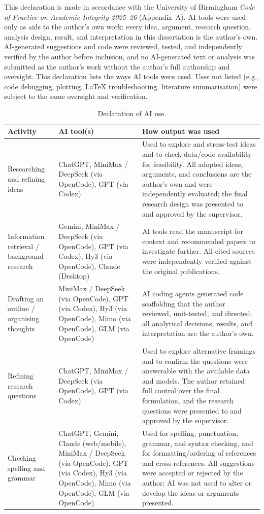 \documentclass[12pt,a4paper]{article}
\begin{document}
This declaration is made in accordance with the University of Birmingham \emph{Code of Practice on Academic Integrity 2025--26} (Appendix~A). AI tools were used only as aids to the author's own work: every idea, argument, research question, analysis design, result, and interpretation in this dissertation is the author's own. AI-generated suggestions and code were reviewed, tested, and independently verified by the author before inclusion, and no AI-generated text or analysis was submitted as the author's work without the author's full authorship and oversight. This declaration lists the ways AI tools were used. Uses not listed (e.g., code debugging, plotting, LaTeX troubleshooting, literature summarisation) were subject to the same oversight and verification.

\begin{table}[ht]
\centering
\small
\caption{Declaration of AI use.}
\label{tab:ai-declaration}
\begin{tabular}{p{}p{}p{}}
\toprule
\textbf{Activity} & \textbf{AI tool(s)} & \textbf{How output was used} \\
\midrule
Researching and refining ideas & ChatGPT, MiniMax / DeepSeek (via OpenCode), GPT (via Codex) & Used to explore and stress-test ideas and to check data/code availability for feasibility. All adopted ideas, arguments, and conclusions are the author's own and were independently evaluated; the final research design was presented to and approved by the supervisor. \\
\midrule
Information retrieval / background research & Gemini, MiniMax / DeepSeek (via OpenCode), GPT (via Codex), Hy3 (via OpenCode), Claude (Desktop) & AI tools read the manuscript for context and recommended papers to investigate further. All cited sources were independently verified against the original publications. \\
\midrule
Drafting an outline / organising thoughts & MiniMax / DeepSeek (via OpenCode), GPT (via Codex), Hy3 (via OpenCode), Mimo (via OpenCode), GLM (via OpenCode) & AI coding agents generated code scaffolding that the author reviewed, unit-tested, and directed; all analytical decisions, results, and interpretation are the author's own. \\
\midrule
Refining research questions & ChatGPT, MiniMax / DeepSeek (via OpenCode), GPT (via Codex) & Used to explore alternative framings and to confirm the questions were answerable with the available data and models. The author retained full control over the final formulation, and the research questions were presented to and approved by the supervisor. \\
\midrule
Checking spelling and grammar & ChatGPT, Gemini, Claude (web/mobile), MiniMax / DeepSeek (via OpenCode), GPT (via Codex), Hy3 (via OpenCode), Mimo (via OpenCode), GLM (via OpenCode) & Used for spelling, punctuation, grammar, and syntax checking, and for formatting/ordering of references and cross-references. All suggestions were accepted or rejected by the author; AI was not used to alter or develop the ideas or arguments presented. \\
\bottomrule
\end{tabular}
\end{table}
\end{document}
